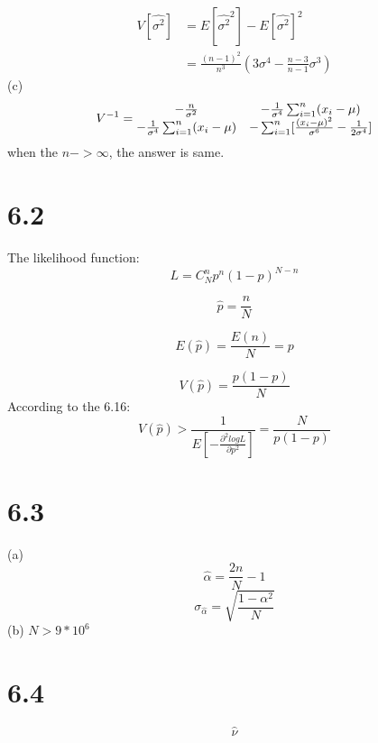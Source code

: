 \documentclass{article}
\begin{document}
\begin{CJK*}{GBK}{song}
\begin{equation}
\end{equation}
\begin{equation}
\begin{aligned}
V[\hat{\sigma^2}]&=E[\hat{\sigma^2}^2]-E[\hat{\sigma^2}]^2\\
&=\frac{(n-1)^2}{n^3}(3\sigma^4-\frac{n-3}{n-1}\sigma^3)
\end{aligned}
\end{equation}
(c)
\begin{equation}
V^{-1}=
  \begin{matrix}
   $$-\frac{n}{\sigma^2}$$ & $$-\frac{1}{\sigma^4}\sum_{i=1}^{n}(x_i-\mu)$$ \\
   $$-\frac{1}{\sigma^4}\sum_{i=1}^{n}(x_i-\mu)$$ & $$-\sum_{i=1}^{n}[\frac{(x_i-\mu)^2}{\sigma^6}-\frac{1}{2\sigma^4}]$$
  \end{matrix} 
  \end{equation}
  when the $n->\infty$, the answer is same.
  
  
\section{6.2}
The likelihood function:
\begin{equation}
L=C_N^np^n(1-p)^{N-n}
\end{equation}

\begin{equation}
\hat{p}=\frac{n}{N}
\end{equation}

\begin{equation}
E(\hat{p})=\frac{E(n)}{N}=p
\end{equation}

\begin{equation}
V(\hat{p})=\frac{p(1-p)}{N}
\end{equation}
According to the 6.16:
\begin{equation}
V(\hat{p})>\frac{1}{E[-\frac{\partial^2logL}{\partial p^2}]}=\frac{N}{p(1-p)}
\end{equation}

\section{6.3}
(a)
\begin{equation}
\hat{\alpha}=\frac{2n}{N}-1
\end{equation}
\begin{equation}
\sigma_{\hat{\alpha}}=\sqrt{\frac{1-\alpha^2}{N}}
\end{equation}
 (b)
 $N>9*10^6$
 
 \section{6.4}
 \begin{equation}
 \hat{\nu}
 \end{equation}
 
 
 
 
\end{CJK*}
\end{document}
